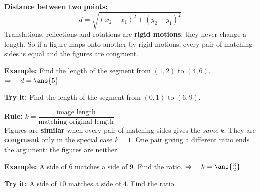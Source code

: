 \documentclass[12pt]{article}
\begin{document}


\begin{formulabox}
\textbf{Distance between two points:}
\[ d = \sqrt{(x_2 - x_1)^2 + (y_2 - y_1)^2} \]
Translations, reflections and rotations are \textbf{rigid motions}: they never change a length.
So if a figure maps onto another by rigid motions, every pair of matching sides is equal and the
figures are congruent.
\end{formulabox}

\begin{examplebox}
\textbf{Example:} \quad Find the length of the segment from $(1, 2)$ to $(4, 6)$.
$\Rightarrow\quad d = \ans{5}$
\end{examplebox}

\begin{tryitbox}
\textbf{Try it:} \quad Find the length of the segment from $(0, 1)$ to $(6, 9)$.\\[2pt]
\end{tryitbox}


\begin{formulabox}
\textbf{Rule:} \quad $k = \dfrac{\text{image length}}{\text{matching original length}}$\\[3pt]
Figures are \textbf{similar} when every pair of matching sides gives the \textit{same} $k$. They
are \textbf{congruent} only in the special case $k = 1$. One pair giving a different ratio ends
the argument: the figures are neither.
\end{formulabox}

\begin{examplebox}
\textbf{Example:} \quad A side of $6$ matches a side of $9$. Find the ratio.
$\Rightarrow\quad k = \ans{\tfrac{3}{2}}$
\end{examplebox}

\begin{tryitbox}
\textbf{Try it:} \quad A side of $10$ matches a side of $4$. Find the ratio.\\[2pt]
\end{tryitbox}
\end{document}
